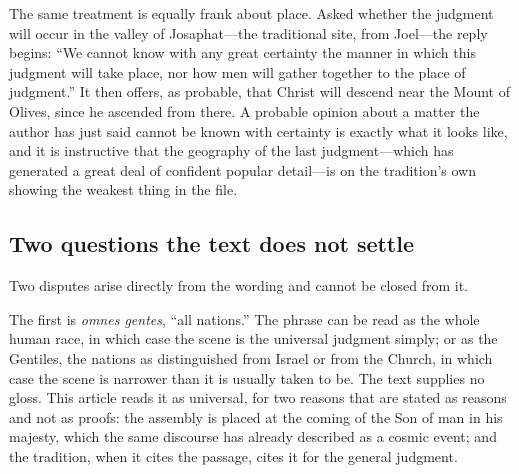 The same treatment is equally frank about place. Asked whether the judgment will occur in the valley of Josaphat---the traditional site, from Joel---the reply begins: ``We cannot know with any great certainty the manner in which this judgment will take place, nor how men will gather together to the place of judgment.'' It then offers, as probable, that Christ will descend near the Mount of Olives, since he ascended from there. A probable opinion about a matter the author has just said cannot be known with certainty is exactly what it looks like, and it is instructive that the geography of the last judgment---which has generated a great deal of confident popular detail---is on the tradition's own showing the weakest thing in the file.

\subsection{Two questions the text does not settle}

Two disputes arise directly from the wording and cannot be closed from it.

The first is \emph{omnes gentes}, ``all nations.'' The phrase can be read as the whole human race, in which case the scene is the universal judgment simply; or as the Gentiles, the nations as distinguished from Israel or from the Church, in which case the scene is narrower than it is usually taken to be. The text supplies no gloss. This article reads it as universal, for two reasons that are stated as reasons and not as proofs: the assembly is placed at the coming of the Son of man in his majesty, which the same discourse has already described as a cosmic event; and the tradition, when it cites the passage, cites it for the general judgment.

